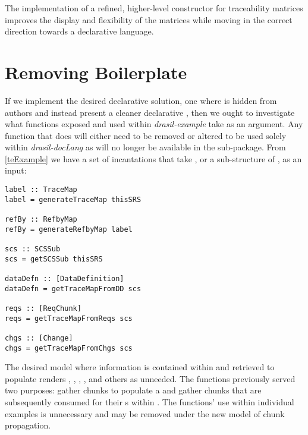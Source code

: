 The implementation of a refined, higher-level  constructor for traceability matrices improves the display and flexibility of the matrices while moving  in the correct direction towards a declarative language. 
\clearpage

\section{Removing Boilerplate}\label{dlToDocLang}  %

If we implement the desired declarative solution, one where  is hidden from authors and instead present a cleaner declarative , then we ought to investigate what functions exposed and used within \textit{drasil-example} take  as an argument. Any function that does will either need to be removed or altered to be used solely within \textit{drasil-docLang} as  will no longer be available in the sub-package. From \autoref{teExample} we have a set of incantations that take , or a sub-structure of , as an input:

\begin{tcolorbox}
\begin{verbatim}
label :: TraceMap
label = generateTraceMap thisSRS

refBy :: RefbyMap
refBy = generateRefbyMap label

scs :: SCSSub
scs = getSCSSub thisSRS

dataDefn :: [DataDefinition]
dataDefn = getTraceMapFromDD scs

reqs :: [ReqChunk]
reqs = getTraceMapFromReqs scs

chgs :: [Change]
chgs = getTraceMapFromChgs scs
\end{verbatim}
\end{tcolorbox}

The desired model where information is contained within  and retrieved to populate  renders , , \linebreak{}, , and others as unneeded. The functions previously served two purposes: gather chunks to populate a  and gather chunks that are subsequently consumed for their s within . The functions' use within individual examples is unnecessary and may be removed under the new model of chunk propagation.

